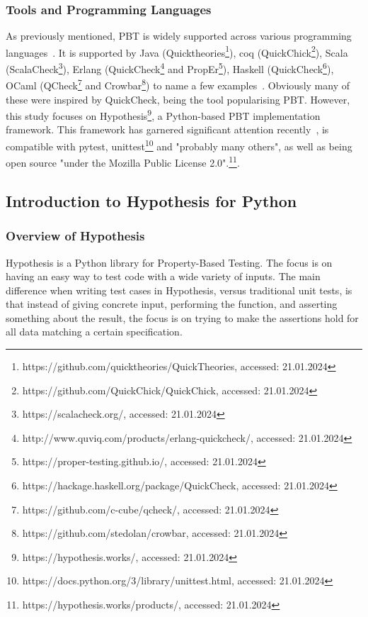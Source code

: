 \documentclass[runningheads]{llncs}
\begin{document}
\subsubsection{Tools and Programming Languages}
As previously mentioned, PBT is widely supported across various programming languages~\cite{Chen2022,Shi2023}. It is supported by Java (Quicktheories\footnote{https://github.com/quicktheories/QuickTheories, accessed: 21.01.2024}), coq (QuickChick\footnote{https://github.com/QuickChick/QuickChick, accessed: 21.01.2024}), Scala (ScalaCheck\footnote{https://scalacheck.org/, accessed: 21.01.2024}), Erlang (QuickCheck\footnote{http://www.quviq.com/products/erlang-quickcheck/, accessed: 21.01.2024} and PropEr\footnote{https://proper-testing.github.io/, accessed: 21.01.2024}), Haskell (QuickCheck\footnote{https://hackage.haskell.org/package/QuickCheck, accessed: 21.01.2024}), OCaml (QCheck\footnote{https://github.com/c-cube/qcheck/, accessed: 21.01.2024} and Crowbar\footnote{https://github.com/stedolan/crowbar, accessed: 21.01.2024}) to name a few examples~\cite{MacIver2016,Padhye2019,Paraskevopoulou2015,Arts2008,Papadakis2011,Claessen2000}. Obviously many of these were inspired by QuickCheck, being the tool popularising PBT. However, this study focuses on Hypothesis\footnote{https://hypothesis.works/, accessed: 21.01.2024}, a Python-based PBT implementation framework. This framework has garnered significant attention recently~\cite{Corgozinho2023,MacIver2019}, is compatible with pytest, unittest\footnote{https://docs.python.org/3/library/unittest.html, accessed: 21.01.2024} and "probably many others", as well as being open source "under the Mozilla Public License 2.0".\footnote{https://hypothesis.works/products/, accessed: 21.01.2024}.

\subsection{Introduction to Hypothesis for Python}
\subsubsection{Overview of Hypothesis}
Hypothesis is a Python library for Property-Based Testing. The focus is on having an easy way to test code with a wide variety of inputs. The main difference when writing test cases in Hypothesis, versus traditional unit tests, is that instead of
giving concrete input, performing the function, and asserting something about the result, the focus is on trying to make the assertions hold for all data matching a certain specification.
\end{document}
